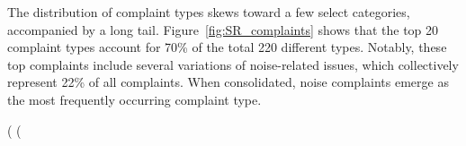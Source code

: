 \documentclass[12pt, titlepage]{article}
\begin{document}

The distribution of complaint types skews toward a few select
categories, accompanied by a long tail. Figure~\ref{fig:SR_complaints}
shows that the top 20 complaint types account for 70\% of the total
220 different types. Notably, these top complaints include several
variations of noise-related issues, which collectively represent 22\%
of all complaints. When consolidated, noise complaints emerge as the
most frequently occurring complaint type.

(%
(%
\end{document}
